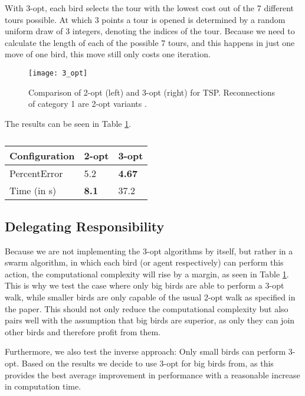 With 3-opt, each bird selects the tour with the lowest cost out of the 7 different tours possible. At which 3 points a tour is opened is determined by a random uniform draw of 3 integers, denoting the indices of the tour. Because we need to calculate the length of each of the possible 7 tours, and this happens in just one move of one bird, this move still only costs one iteration.

\begin{figure}[htbp]
\centerline{\texttt{[image: 3\_opt]}}
\caption{Comparison of 2-opt (left) and 3-opt (right) for TSP. Reconnections of category 1 are 2-opt variants \cite{3_opt}.}
\label{3_opt}
\end{figure}

The results can be seen in Table \ref{3_opt_performance}.

\begin{table}[h!]
\centering
\begin{tabular}{ |p{2cm}||p{0.75cm}|p{0.75cm}|  }
 \hline
 Configuration& 2-opt & 3-opt\\
 \hline \hline
PercentError & 5.2 & \textbf{4.67}\\
 \hline
 Time (in s) & \textbf{8.1} & 37.2\\
 \hline
\end{tabular}
\caption{}
\label{3_opt_performance}
\end{table}

\subsection{Delegating Responsibility}

Because we are not implementing the 3-opt algorithms by itself, but rather in a swarm algorithm, in which each bird (or agent respectively) can perform this action, the computational complexity will rise by a margin, as seen in Table \ref{3_opt_performance}. This is why we test the case where only big birds are able to perform a 3-opt walk, while smaller birds are only capable of the usual 2-opt walk as specified in the paper. This should not only reduce the computational complexity but also pairs well with the assumption that big birds are superior, as only they can join other birds and therefore profit from them.

Furthermore, we also test the inverse approach: Only small birds can perform 3-opt.
Based on the results we decide to use 3-opt for big birds from, as this provides the best average improvement in performance with a reasonable increase in computation time.


